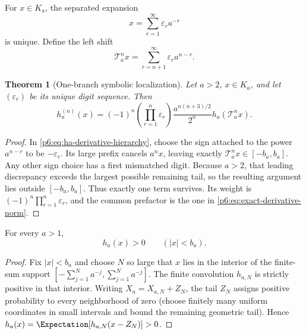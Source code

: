 \documentclass[11pt,oneside]{article}
\numberwithin{equation}{section}
\newtheorem{theorem}{Theorem}[section]
\theoremstyle{definition}
\theoremstyle{remark}
\begin{document}
For $x\in K_a$, the separated expansion
\begin{equation}\label{p6:eq:digit-expansion}
 x=\sum_{r=1}^{\infty}\varepsilon_ra^{-r}
\end{equation}
is unique.  Define the left shift
\begin{equation}\label{p6:eq:Ta-shift}
 \mathcal T_a^n x
 =\sum_{r=n+1}^{\infty}\varepsilon_ra^{n-r}.
\end{equation}

\begin{theorem}[One-branch symbolic localization]\label{p6:thm:symbolic-localization}
Let $a>2$, $x\in K_a$, and let $(\varepsilon_r)$ be its unique digit sequence.
Then
\begin{equation}\label{p6:eq:symbolic-localization}
 h_a^{(n)}(x)=
 (-1)^n\left(\prod_{r=1}^{n}\varepsilon_r\right)
 \frac{a^{n(n+3)/2}}{2^n}
 h_a(\mathcal T_a^n x).
\end{equation}
\end{theorem}

\begin{proof}
In \eqref{p6:eq:ha-derivative-hierarchy}, choose the sign attached to the power
$a^{n-r}$ to be $-\varepsilon_r$.  Its large prefix cancels
$a^nx$, leaving exactly $\mathcal T_a^nx\in[-b_a,b_a]$.  Any other sign choice
has a first mismatched digit.  Because $a>2$, that leading discrepancy exceeds
the largest possible remaining tail, so the resulting argument lies outside
$[-b_a,b_a]$.  Thus exactly one term survives.  Its weight is
$(-1)^n\prod_{r=1}^{n}\varepsilon_r$, and the common prefactor is the one in
\eqref{p6:eq:exact-derivative-norm}.
\end{proof}

\begin{lemma}\label{p6:lem:positive-interior}
For every $a>1$,
\[
 h_a(x)>0\qquad (|x|<b_a).
\]
\end{lemma}

\begin{proof}
Fix $|x|<b_a$ and choose $N$ so large that $x$ lies in the interior of the
finite-sum support
$[-\sum_{j=1}^N a^{-j},\sum_{j=1}^N a^{-j}]$.  The finite convolution
$h_{a,N}$ is strictly positive in that interior.  Writing
$X_a=X_{a,N}+Z_N$, the tail $Z_N$ assigns positive probability to every
neighborhood of zero (choose finitely many uniform coordinates in small
intervals and bound the remaining geometric tail).  Hence
$h_a(x)=\Expectation[h_{a,N}(x-Z_N)]>0$.
\end{proof}
\end{document}
